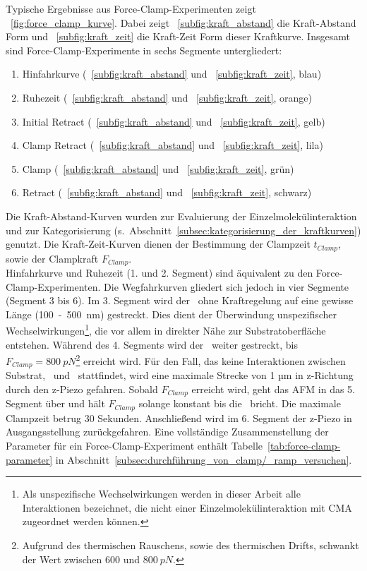 Typische Ergebnisse aus Force-Clamp-Experimenten zeigt \abb~\ref{fig:force_clamp_kurve}. Dabei zeigt \abb~\ref{subfig:kraft_abstand} die Kraft-Abstand Form und \abb~\ref{subfig:kraft_zeit} die Kraft-Zeit Form dieser Kraftkurve. Insgesamt sind Force-Clamp-Experimente in sechs Segmente untergliedert:

\begin{enumerate}
	\renewcommand\labelenumi{\bfseries\theenumi.}
	
	\item Hinfahrkurve (\abb~\ref{subfig:kraft_abstand} und \abb~\ref{subfig:kraft_zeit}, blau)
	\item Ruhezeit (\abb~\ref{subfig:kraft_abstand} und \abb~\ref{subfig:kraft_zeit}, orange)
	\item Initial Retract (\abb~\ref{subfig:kraft_abstand} und \abb~\ref{subfig:kraft_zeit}, gelb)
	\item Clamp Retract (\abb~\ref{subfig:kraft_abstand} und \abb~\ref{subfig:kraft_zeit}, lila)
	\item Clamp (\abb~\ref{subfig:kraft_abstand} und \abb~\ref{subfig:kraft_zeit}, grün)
	\item Retract (\abb~\ref{subfig:kraft_abstand} und \abb~\ref{subfig:kraft_zeit}, schwarz)
	
\end{enumerate}

Die Kraft-Abstand-Kurven wurden zur Evaluierung der Einzelmolekülinteraktion und zur Kategorisierung (s.~Abschnitt~\ref{subsec:kategorisierung_der_kraftkurven}) genutzt. Die Kraft-Zeit-Kurven dienen der Bestimmung der Clampzeit $t_{Clamp}$, sowie der Clampkraft $F_{Clamp}$.\\
Hinfahrkurve und Ruhezeit (1. und 2. Segment) sind äquivalent zu den Force-Clamp-Experimenten. Die Wegfahrkurven gliedert sich jedoch in vier Segmente (Segment 3 bis 6). Im 3. Segment wird der \spacer~ohne Kraftregelung auf eine gewisse Länge (100~-~500~nm) gestreckt. Dies dient der Überwindung unspezifischer Wechselwirkungen\footnote{Als unspezifische Wechselwirkungen werden in dieser Arbeit alle Interaktionen bezeichnet, die nicht einer Einzelmolekülinteraktion mit \ac{CMA} zugeordnet werden können.}, die vor allem in direkter Nähe zur Substratoberfläche entstehen. Während des 4. Segments wird der \spacer~weiter gestreckt, bis $F_{Clamp} = 800~pN$\footnote{Aufgrund des thermischen Rauschens, sowie des thermischen Drifts, schwankt der Wert zwischen $600$ und $800~pN$.} erreicht wird. Für den Fall, das keine Interaktionen zwischen Substrat, \spitze~und \spacer~stattfindet, wird eine maximale Strecke von 1 µm in z-Richtung durch den z-Piezo gefahren. Sobald $F_{Clamp}$ erreicht wird, geht das \ac{AFM} in das 5. Segment über und hält $F_{Clamp}$ solange konstant bis die \amid~bricht. Die maximale Clampzeit betrug 30 Sekunden. Anschließend wird im 6. Segment der z-Piezo in Ausgangsstellung zurückgefahren. Eine vollständige Zusammenstellung der Parameter für ein Force-Clamp-Experiment enthält Tabelle~\ref{tab:force-clamp-parameter} in Abschnitt~\ref{subsec:durchführung_von_clamp/_ramp_versuchen}.

